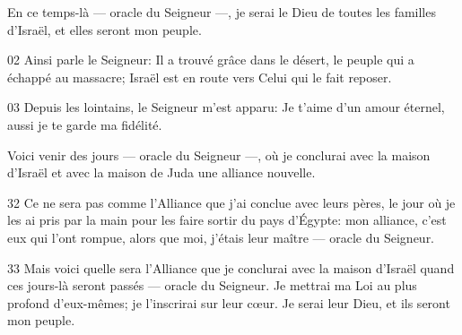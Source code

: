 En ce temps-là --- oracle du Seigneur ---, je serai le Dieu de toutes les familles d’Israël, et elles seront mon peuple.

02 Ainsi parle le Seigneur: Il a trouvé grâce dans le désert, le peuple qui a échappé au massacre; Israël est en route vers Celui qui le fait reposer.

03 Depuis les lointains, le Seigneur m’est apparu: Je t’aime d’un amour éternel, aussi je te garde ma fidélité.

Voici venir des jours --- oracle du Seigneur ---, où je conclurai avec la maison d’Israël et avec la maison de Juda une alliance nouvelle.

32 Ce ne sera pas comme l’Alliance que j’ai conclue avec leurs pères, le jour où je les ai pris par la main pour les faire sortir du pays d’Égypte: mon alliance, c’est eux qui l’ont rompue, alors que moi, j’étais leur maître --- oracle du Seigneur.

33 Mais voici quelle sera l’Alliance que je conclurai avec la maison d’Israël quand ces jours-là seront passés --- oracle du Seigneur. Je mettrai ma Loi au plus profond d’eux-mêmes; je l’inscrirai sur leur cœur. Je serai leur Dieu, et ils seront mon peuple.